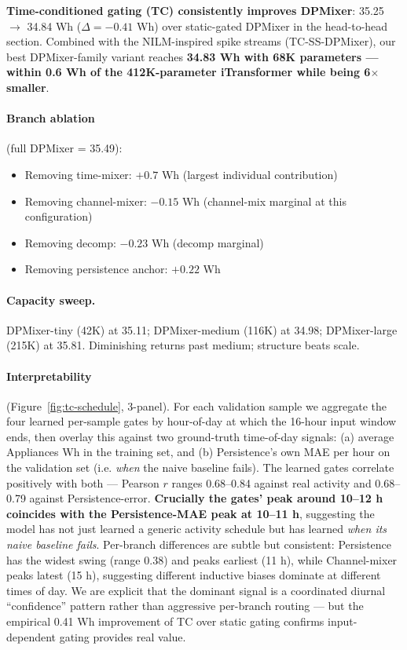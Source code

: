 \documentclass[11pt,letterpaper]{article}
\begin{document}
\textbf{Time-conditioned gating (TC) consistently improves DPMixer}:
35.25 $\rightarrow$ 34.84 Wh ($\Delta = -0.41$ Wh) over static-gated
DPMixer in the head-to-head section. Combined with the NILM-inspired spike
streams (TC-SS-DPMixer), our best DPMixer-family variant reaches
\textbf{34.83 Wh with 68K parameters --- within 0.6 Wh of the
412K-parameter iTransformer while being 6$\times$ smaller}.

\paragraph{Branch ablation} (full DPMixer = 35.49):
\begin{itemize}[leftmargin=*,itemsep=1pt]
  \item Removing time-mixer: $+0.7$ Wh (largest individual contribution)
  \item Removing channel-mixer: $-0.15$ Wh (channel-mix marginal at this configuration)
  \item Removing decomp: $-0.23$ Wh (decomp marginal)
  \item Removing persistence anchor: $+0.22$ Wh
\end{itemize}

\paragraph{Capacity sweep.} DPMixer-tiny (42K) at 35.11; DPMixer-medium
(116K) at 34.98; DPMixer-large (215K) at 35.81. Diminishing returns past
medium; structure beats scale.

\paragraph{Interpretability} (Figure~\ref{fig:tc-schedule}, 3-panel). For
each validation sample we aggregate the four learned per-sample gates by
hour-of-day at which the 16-hour input window ends, then overlay this
against two ground-truth time-of-day signals: (a) average Appliances Wh
in the training set, and (b) Persistence's own MAE per hour on the
validation set (i.e. \emph{when} the naive baseline fails). The learned
gates correlate positively with both --- Pearson $r$ ranges 0.68--0.84
against real activity and 0.68--0.79 against Persistence-error.
\textbf{Crucially the gates' peak around 10--12 h coincides with the
Persistence-MAE peak at 10--11 h}, suggesting the model has not just
learned a generic activity schedule but has learned \emph{when its naive
baseline fails}. Per-branch differences are subtle but consistent:
Persistence has the widest swing (range 0.38) and peaks earliest (11 h),
while Channel-mixer peaks latest (15 h), suggesting different inductive
biases dominate at different times of day. We are explicit that the
dominant signal is a coordinated diurnal ``confidence'' pattern rather
than aggressive per-branch routing --- but the empirical 0.41 Wh
improvement of TC over static gating confirms input-dependent gating
provides real value.
\end{document}
